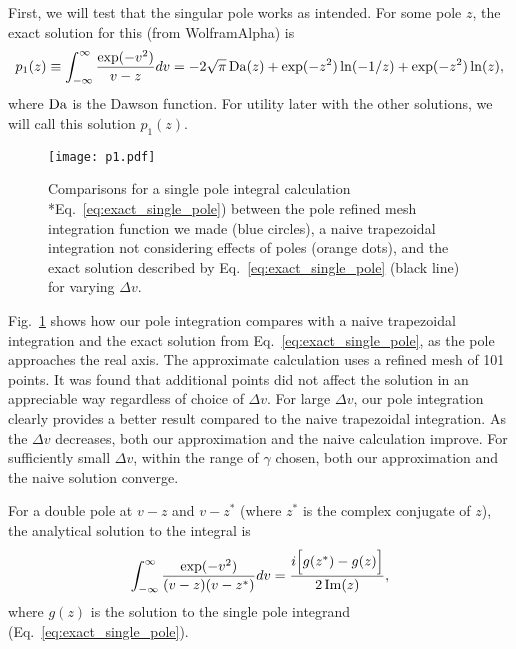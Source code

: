 First, we will test that the singular pole works as intended.
For some pole $z$, the exact solution for this (from WolframAlpha) is
\begin{equation}
	p_1(z) \equiv \int_{-\infty}^\infty \frac{ \exp(-v^2)}{v - z} dv= 
	-2 \sqrt{\pi} \operatorname{Da}(z) + \exp(-z^2) \ln(-1/z) + \exp(-z^2) \ln(z),
	\label{eq:exact_single_pole}
\end{equation}
where $\operatorname{Da}$ is the Dawson function. %
For utility later with the other solutions, we will call this solution $p_1(z)$.

\begin{figure}[!htb]
	\centering
	\texttt{[image: p1.pdf]}
	\caption{Comparisons for a single pole integral calculation *Eq.~\ref{eq:exact_single_pole})
		between the pole refined mesh integration function we made (blue circles), %
		a naive trapezoidal integration not considering effects of poles (orange dots), and
		the exact solution described by Eq.~\ref{eq:exact_single_pole} (black line)
		for varying $\Delta v$.}
	\label{f:single_pole_comparison}
\end{figure}

Fig.~\ref{f:single_pole_comparison} shows how our pole integration compares with 
a naive trapezoidal integration and the exact solution from Eq.~\ref{eq:exact_single_pole},
as the pole approaches the real axis.
The approximate calculation uses a refined mesh of 101 points. 
It was found that additional points did not affect the solution in an appreciable way regardless of choice of $\Delta v$.
For large $\Delta v$, our pole integration clearly provides a better result
compared to the naive trapezoidal integration. 
As the $\Delta v$ decreases, both our approximation and the naive calculation improve.
For sufficiently small $\Delta v$, within the range of $\gamma$ chosen, both our
approximation and the naive solution converge.


For a double pole at $v - z$ and $v-z^*$ (where $z^*$ is the complex conjugate of $z$), the analytical solution to the integral is
\begin{equation}
	\int_{-\infty}^\infty \frac{\exp (-v^2)}{(v-z)(v-z^*)} dv = 
	\frac{i \Big[ g(z^*) - g(z)  \Big]}{2 \operatorname{Im}(z)},
	\label{eq:exact_double_pole}
\end{equation}
where $g(z)$ is the solution to the single pole integrand (Eq.~\ref{eq:exact_single_pole}).



